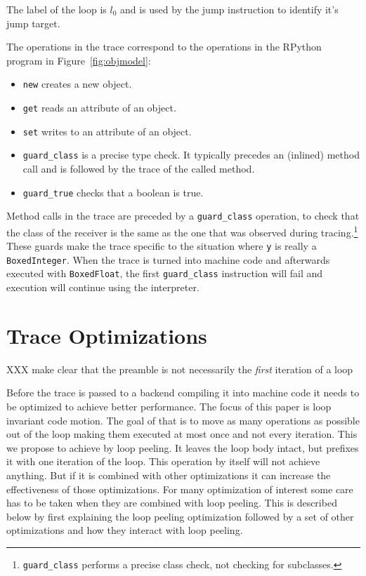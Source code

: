 \documentclass[preprint]{sigplanconf}
\begin{document}
The label of the loop is $l_0$ and is used by the jump instruction to
identify it's jump target.

The operations in the trace correspond to the operations in the RPython program
in Figure~\ref{fig:objmodel}:

\begin{itemize}
    \item \lstinline{new} creates a new object.
    \item \lstinline{get} reads an attribute of an object.
    \item \lstinline{set} writes to an attribute of an object.
    \item \lstinline{guard_class} is a precise type check. It typically precedes
    an (inlined) method call and is followed by the trace of the called method.
    \item \lstinline{guard_true} checks that a boolean is true.
\end{itemize}

Method calls in the trace are preceded by a \lstinline{guard_class}
operation, to check that the class of the receiver is the same as the one that
was observed during tracing.\footnote{\lstinline{guard_class}
performs a precise
class check, not checking for subclasses.} These guards make the trace specific
to the situation where \lstinline{y} is really a \lstinline{BoxedInteger}. When
the trace is turned into machine code and afterwards executed with
\lstinline{BoxedFloat}, the
first \lstinline{guard_class} instruction will fail and execution will continue
using the interpreter.

\section{Trace Optimizations}

XXX make clear that the preamble is not necessarily the \emph{first} iteration
of a loop

Before the trace is passed to a backend compiling it into machine code
it needs to be optimized to achieve better performance.
The focus of this paper
is loop invariant code motion. The goal of that is to move as many
operations as possible out of the loop making them executed at most once
and not every iteration. This we propose to achieve by loop peeling. It
leaves the loop body intact, but prefixes it with one iteration of the
loop. This operation by itself will not achieve anything. But if it is
combined with other optimizations it can increase the effectiveness of
those optimizations. For many optimization of interest some care has
to be taken when they are combined with loop peeling. This is
described below by first explaining the loop peeling optimization
followed by a set of other optimizations and how they interact with
loop peeling.
\end{document}
